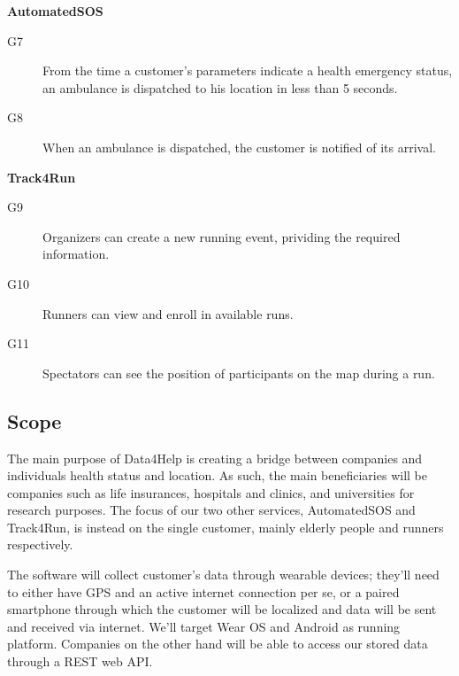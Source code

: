 \documentclass[../main.tex]{subfiles}
\begin{document}
\begin{minipage}{\textwidth}
{\bf AutomatedSOS}
\begin{description}
	\item [G7]  From the time a customer's parameters indicate a health emergency status, an ambulance is dispatched to his location in less than 5 seconds.
	\item [G8]  When an ambulance is dispatched, the customer is notified of its arrival.
\end{description}
\end{minipage}
\vspace{8mm}

\begin{minipage}{\textwidth}
{\bf Track4Run}
\begin{description}
	\item [G9]   Organizers can create a new running event, prividing the required information.
	\item [G10]  Runners can view and enroll in available runs.
	\item [G11]  Spectators can see the position of participants on the map during a run.
\end{description}
\end{minipage}

\subsection{Scope}

The main purpose of Data4Help is creating a bridge between companies and individuals health status and location. As such, the main beneficiaries will be companies such as life insurances, hospitals and clinics, and universities for research purposes.
The focus of our two other services, AutomatedSOS and Track4Run, is instead on the single customer, mainly elderly people and runners respectively.

The software will collect customer's data through wearable devices; they'll need to either have GPS and an active internet connection per se, or a paired smartphone through which the customer will be localized and data will be sent and received via internet. We'll target Wear OS and Android as running platform. Companies on the other hand will be able to access our stored data through a REST web API.
\end{document}
